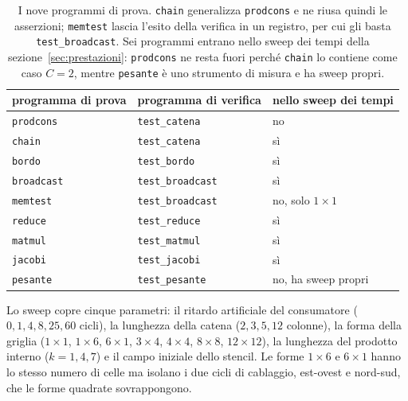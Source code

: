 \begin{table}[htbp]
    \centering
    \begin{tabular}{lll}
        \toprule
        programma di prova & programma di verifica & nello sweep dei tempi \\
        \midrule
        \texttt{prodcons}  & \texttt{test\_catena}    & no \\
        \texttt{chain}     & \texttt{test\_catena}    & sì \\
        \texttt{bordo}     & \texttt{test\_bordo}     & sì \\
        \texttt{broadcast} & \texttt{test\_broadcast} & sì \\
        \texttt{memtest}   & \texttt{test\_broadcast} & no, solo $1\times1$ \\
        \texttt{reduce}    & \texttt{test\_reduce}    & sì \\
        \texttt{matmul}    & \texttt{test\_matmul}    & sì \\
        \texttt{jacobi}    & \texttt{test\_jacobi}    & sì \\
        \texttt{pesante}   & \texttt{test\_pesante}   & no, ha sweep propri \\
        \bottomrule
    \end{tabular}
    \caption[I nove programmi di prova]{
             I nove programmi di prova. \texttt{chain} generalizza
             \texttt{prodcons} e ne riusa quindi le asserzioni;
             \texttt{memtest} lascia l'esito della verifica in un
             registro, per cui gli basta \texttt{test\_broadcast}. Sei
             programmi entrano nello sweep dei tempi della
             sezione~\ref{sec:prestazioni}: \texttt{prodcons} ne resta fuori
             perché \texttt{chain} lo contiene come caso $C = 2$, mentre
             \texttt{pesante} è uno strumento di misura e ha sweep propri.}
    \label{tab:programmi}
\end{table}

Lo sweep copre cinque parametri: il ritardo artificiale
del consumatore ($0, 1, 4, 8, 25, 60$ cicli), la lunghezza della catena
($2, 3, 5, 12$ colonne), la forma della griglia ($1\times1$, $1\times6$,
$6\times1$, $3\times4$, $4\times4$, $8\times8$, $12\times12$), la lunghezza del
prodotto interno ($k = 1, 4, 7$) e il campo iniziale dello stencil. Le forme
$1\times6$ e $6\times1$ hanno lo stesso numero di celle ma isolano i due cicli
di cablaggio, est-ovest e nord-sud, che le forme quadrate sovrappongono.

